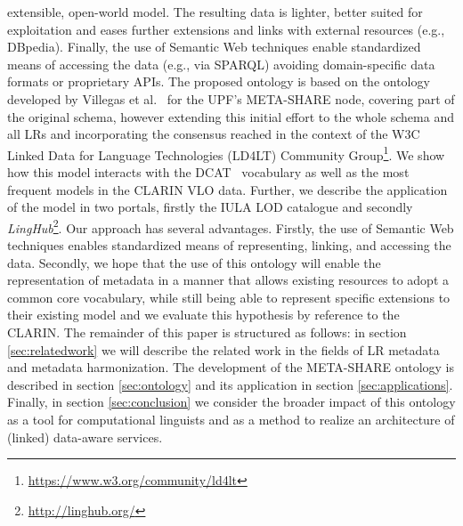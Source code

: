 \documentclass{llncs}
\begin{document}
extensible, open-world model.
The resulting data is lighter, better suited for exploitation and eases further extensions and links with external resources (e.g., DBpedia).
Finally, the use of Semantic Web techniques enable standardized means of
accessing the data (e.g., via SPARQL) avoiding domain-specific data formats or proprietary APIs.
The proposed ontology is based on the ontology developed by Villegas et al.~\cite{Villegas2014} for the UPF's META-SHARE node, covering part of the original schema, however extending this initial effort to the whole schema and all LRs and incorporating the consensus
reached in the context of the W3C Linked Data for Language Technologies (LD4LT) Community Group\footnote{\url{https://www.w3.org/community/ld4lt}}.
We show how this model interacts with the DCAT~\cite{maali2014data} vocabulary
as well as the most frequent models in the CLARIN VLO data.
Further, we describe the application of the model in two portals, firstly the
IULA LOD catalogue and secondly
\emph{LingHub}\footnote{\url{http://linghub.org/}}.
Our approach has several advantages. Firstly, the use of Semantic Web techniques enables standardized means of representing, linking, and accessing the data.
Secondly, we hope that the use of this ontology will enable the representation of metadata in a manner that allows existing resources to adopt a
common core vocabulary, while still being able to represent specific extensions
to their existing model and we evaluate this hypothesis by reference to the
CLARIN.
The remainder of this paper is structured as follows: in section
\ref{sec:relatedwork} we will describe the related work in the fields of
LR metadata and metadata harmonization. The development of the
META-SHARE ontology is described in section \ref{sec:ontology}
and its application in section \ref{sec:applications}.
Finally, in section \ref{sec:conclusion} we consider the broader
impact of this ontology as a tool for computational linguists and as a method to
realize an architecture of (linked) data-aware services.
\end{document}
